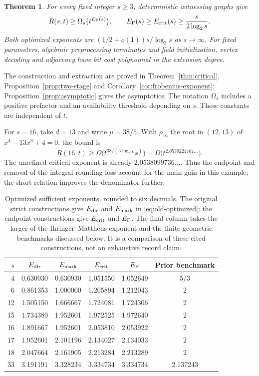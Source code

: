 \documentclass[11pt,a4paper]{article}
\newtheorem{theorem}{Theorem}[section]
\theoremstyle{definition}
\theoremstyle{remark}
\numberwithin{equation}{section}
\begin{document}
\begin{theorem}\label{thm:main}
For every fixed integer $s\ge3$, deterministic witnessing graphs give
\[
R(s,t)\ge\Omega_s\bigl(t^{E_{\rm F}(s)}\bigr),\qquad
E_{\rm F}(s)\ge E_{\rm crit}(s)\ge\frac{s}{2\log_2s}.
\]
Both optimized exponents are $(1/2+o(1))s/\log_2s$ as $s\to\infty$. For fixed parameters, algebraic preprocessing terminates and field initialization, vertex decoding and adjacency have bit cost polynomial in the extension degree.
\end{theorem}

The construction and extraction are proved in Theorem~\ref{thm:critical}, Proposition~\ref{prop:two-stage} and Corollary~\ref{cor:frobenius-exponent}; Proposition~\ref{prop:asymptotic} gives the asymptotics. The notation $\Omega_s$ includes a positive prefactor and an availability threshold depending on $s$. These constants are independent of $t$.

For $s=16$, take $d=13$ and write $\mu=38/5$. With $\rho_{16}$ the root in $(12,13)$ of $x^4-13x^3+4=0$, the bound is
\[
R(16,t)\ge\Omega\bigl(t^{38/(5\log_2\rho_{16})}\bigr)
=\Omega\bigl(t^{2.0539221767\ldots}\bigr).
\]
The unrefined critical exponent is already $2.0538099736\ldots$. Thus the endpoint and removal of the integral rounding loss account for the main gain in this example; the short relation improves the denominator further.

\begin{table}[t]
\centering\small
\setlength{\tabcolsep}{5pt}
\begin{tabular}{rccccc}
\toprule
$s$ & $E_{\rm dir}$ & $E_{\rm mark}$ & $E_{\rm crit}$ & $E_{\rm F}$ & Prior benchmark\\
\midrule
4  & 0.630930 & 0.630930 & 1.051550 & 1.052649 & $5/3$\\
6  & 0.861353 & 1.000000 & 1.205894 & 1.212043 & $2$\\
12 & 1.505150 & 1.666667 & 1.724081 & 1.724306 & $2$\\
15 & 1.734389 & 1.952601 & 1.972525 & 1.972640 & $2$\\
16 & 1.891667 & 1.952601 & 2.053810 & 2.053922 & $2$\\
17 & 1.952601 & 2.101196 & 2.134027 & 2.134033 & $2$\\
18 & 2.047664 & 2.161905 & 2.213284 & 2.213289 & $2$\\
33 & 3.191191 & 3.328234 & 3.334734 & 3.334734 & 2.137243\\
\bottomrule
\end{tabular}
\caption{Optimized sufficient exponents, rounded to six decimals. The original strict constructions give $E_{\rm dir}$ and $E_{\rm mark}$ in \eqref{eq:old-optimized}; the endpoint constructions give $E_{\rm crit}$ and $E_{\rm F}$. The final column takes the larger of the Ihringer--Mattheus exponent and the finite-geometric benchmarks discussed below. It is a comparison of these cited constructions, not an exhaustive record claim.}\label{tab:comparison}
\end{table}
\end{document}
